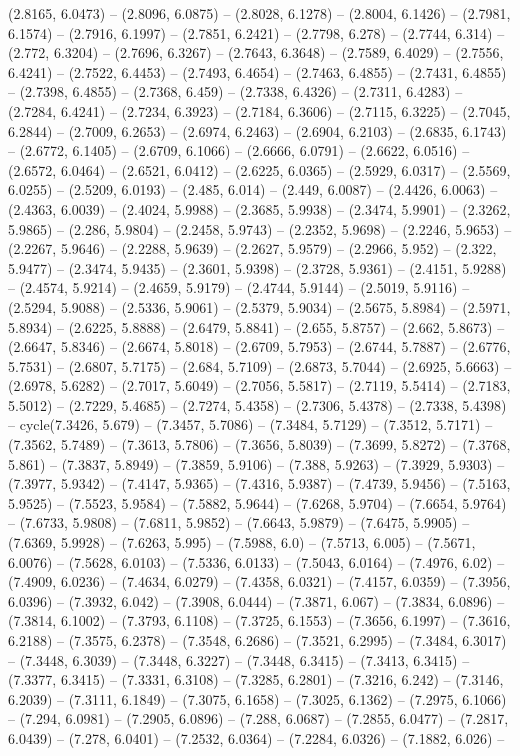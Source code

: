 (2.8165, 6.0473) -- (2.8096, 6.0875) -- (2.8028, 6.1278) -- (2.8004, 6.1426) -- (2.7981, 6.1574) -- (2.7916, 6.1997) -- (2.7851, 6.2421) -- (2.7798, 6.278) -- (2.7744, 6.314) -- (2.772, 6.3204) -- (2.7696, 6.3267) -- (2.7643, 6.3648) -- (2.7589, 6.4029) -- (2.7556, 6.4241) -- (2.7522, 6.4453) -- (2.7493, 6.4654) -- (2.7463, 6.4855) -- (2.7431, 6.4855) -- (2.7398, 6.4855) -- (2.7368, 6.459) -- (2.7338, 6.4326) -- (2.7311, 6.4283) -- (2.7284, 6.4241) -- (2.7234, 6.3923) -- (2.7184, 6.3606) -- (2.7115, 6.3225) -- (2.7045, 6.2844) -- (2.7009, 6.2653) -- (2.6974, 6.2463) -- (2.6904, 6.2103) -- (2.6835, 6.1743) -- (2.6772, 6.1405) -- (2.6709, 6.1066) -- (2.6666, 6.0791) -- (2.6622, 6.0516) -- (2.6572, 6.0464) -- (2.6521, 6.0412) -- (2.6225, 6.0365) -- (2.5929, 6.0317) -- (2.5569, 6.0255) -- (2.5209, 6.0193) -- (2.485, 6.014) -- (2.449, 6.0087) -- (2.4426, 6.0063) -- (2.4363, 6.0039) -- (2.4024, 5.9988) -- (2.3685, 5.9938) -- (2.3474, 5.9901) -- (2.3262, 5.9865) -- (2.286, 5.9804) -- (2.2458, 5.9743) -- (2.2352, 5.9698) -- (2.2246, 5.9653) -- (2.2267, 5.9646) -- (2.2288, 5.9639) -- (2.2627, 5.9579) -- (2.2966, 5.952) -- (2.322, 5.9477) -- (2.3474, 5.9435) -- (2.3601, 5.9398) -- (2.3728, 5.9361) -- (2.4151, 5.9288) -- (2.4574, 5.9214) -- (2.4659, 5.9179) -- (2.4744, 5.9144) -- (2.5019, 5.9116) -- (2.5294, 5.9088) -- (2.5336, 5.9061) -- (2.5379, 5.9034) -- (2.5675, 5.8984) -- (2.5971, 5.8934) -- (2.6225, 5.8888) -- (2.6479, 5.8841) -- (2.655, 5.8757) -- (2.662, 5.8673) -- (2.6647, 5.8346) -- (2.6674, 5.8018) -- (2.6709, 5.7953) -- (2.6744, 5.7887) -- (2.6776, 5.7531) -- (2.6807, 5.7175) -- (2.684, 5.7109) -- (2.6873, 5.7044) -- (2.6925, 5.6663) -- (2.6978, 5.6282) -- (2.7017, 5.6049) -- (2.7056, 5.5817) -- (2.7119, 5.5414) -- (2.7183, 5.5012) -- (2.7229, 5.4685) -- (2.7274, 5.4358) -- (2.7306, 5.4378) -- (2.7338, 5.4398) -- cycle(7.3426, 5.679) -- (7.3457, 5.7086) -- (7.3484, 5.7129) -- (7.3512, 5.7171) -- (7.3562, 5.7489) -- (7.3613, 5.7806) -- (7.3656, 5.8039) -- (7.3699, 5.8272) -- (7.3768, 5.861) -- (7.3837, 5.8949) -- (7.3859, 5.9106) -- (7.388, 5.9263) -- (7.3929, 5.9303) -- (7.3977, 5.9342) -- (7.4147, 5.9365) -- (7.4316, 5.9387) -- (7.4739, 5.9456) -- (7.5163, 5.9525) -- (7.5523, 5.9584) -- (7.5882, 5.9644) -- (7.6268, 5.9704) -- (7.6654, 5.9764) -- (7.6733, 5.9808) -- (7.6811, 5.9852) -- (7.6643, 5.9879) -- (7.6475, 5.9905) -- (7.6369, 5.9928) -- (7.6263, 5.995) -- (7.5988, 6.0) -- (7.5713, 6.005) -- (7.5671, 6.0076) -- (7.5628, 6.0103) -- (7.5336, 6.0133) -- (7.5043, 6.0164) -- (7.4976, 6.02) -- (7.4909, 6.0236) -- (7.4634, 6.0279) -- (7.4358, 6.0321) -- (7.4157, 6.0359) -- (7.3956, 6.0396) -- (7.3932, 6.042) -- (7.3908, 6.0444) -- (7.3871, 6.067) -- (7.3834, 6.0896) -- (7.3814, 6.1002) -- (7.3793, 6.1108) -- (7.3725, 6.1553) -- (7.3656, 6.1997) -- (7.3616, 6.2188) -- (7.3575, 6.2378) -- (7.3548, 6.2686) -- (7.3521, 6.2995) -- (7.3484, 6.3017) -- (7.3448, 6.3039) -- (7.3448, 6.3227) -- (7.3448, 6.3415) -- (7.3413, 6.3415) -- (7.3377, 6.3415) -- (7.3331, 6.3108) -- (7.3285, 6.2801) -- (7.3216, 6.242) -- (7.3146, 6.2039) -- (7.3111, 6.1849) -- (7.3075, 6.1658) -- (7.3025, 6.1362) -- (7.2975, 6.1066) -- (7.294, 6.0981) -- (7.2905, 6.0896) -- (7.288, 6.0687) -- (7.2855, 6.0477) -- (7.2817, 6.0439) -- (7.278, 6.0401) -- (7.2532, 6.0364) -- (7.2284, 6.0326) -- (7.1882, 6.026) -- 